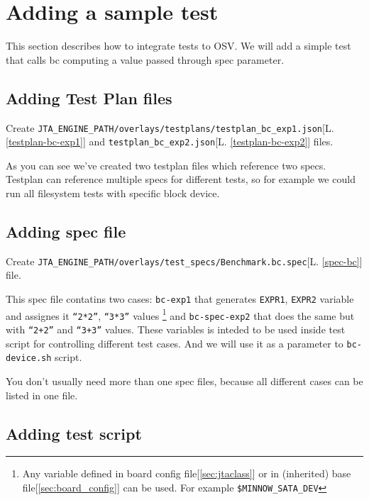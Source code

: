 \section{Adding a sample test}
\label{sec:adding-tests}

This section describes how to integrate tests to OSV.
We will add a simple test that calls bc computing a value passed through spec parameter.

\subsection{Adding Test Plan files}
\label{sec:test-add-testplan}
Create \texttt{JTA\_ENGINE\_PATH/overlays/testplans/testplan\_bc\_exp1.json}[L. \ref{testplan-bc-exp1}] and \texttt{testplan\_bc\_exp2.json}[L. \ref{testplan-bc-exp2}] files.

As you can see we've created two testplan files which reference two specs. Testplan can reference multiple specs for different tests, so for example we could run all filesystem tests with specific block device.

\subsection{Adding spec file}
\label{sec:test-add-spec}

Create \texttt{JTA\_ENGINE\_PATH/overlays/test\_specs/Benchmark.bc.spec}[L. \ref{spec-bc}] file.

This spec file contatins two cases: \texttt{bc-exp1} that generates \texttt{EXPR1}, \texttt{EXPR2} variable and assignes it \texttt{``2*2''}, \texttt{``3*3''} values \footnote{Any variable defined in board config file[\ref{sec:jtaclass}] or in (inherited) base file[\ref{sec:board_config}] can be used. For example \texttt{\$MINNOW\_SATA\_DEV}}
and \texttt{bc-spec-exp2} that does the same but with \texttt{``2+2''} and \texttt{``3+3''} values. These variables is inteded to be used inside test script for controlling different test cases. And we will use it as a parameter to \texttt{bc-device.sh} script.

You don't usually need more than one spec files, because all different cases can be listed in one file. 

\subsection{Adding test script}
\label{sec:test-add-script}

